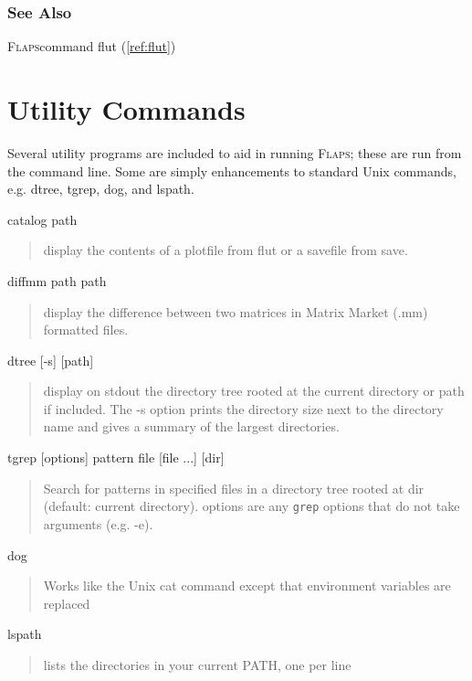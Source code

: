 \documentclass[11pt,openany,twoside]{book}
\numberwithin{equation}{section}		%
\newcommand{\Cmd}[1]{{\sf #1}}
\newcommand{\Code}[1]{{\small\tt #1}}
\newcommand{\Subst}[1]{{\small\sf #1}}
\newcommand{\Flaps}{\textsc{Flaps\:}}
\newcommand{\Spec}[1]{{\small\ttfamily #1}}
\begin{document}
\subsubsection{See Also}
\Flaps command \Cmd{flut} (\ref{ref:flut})
        
\section{Utility Commands}\label{sect:utility}
Several utility programs are included to aid in running \Flaps;
these are run from the command line. Some are simply enhancements
to standard Unix commands, e.g. \Cmd{dtree}, \Cmd{tgrep},
\Cmd{dog}, and \Cmd{lspath}.
\newline

\Spec{catalog \Subst{path}}
\begin{quote}
display the contents of a plotfile from \Cmd{flut} or a
savefile from \Cmd{save}.
\end{quote}

\Spec{diffmm \Subst{path} \Subst{path}}
\begin{quote}
display the difference between two matrices in Matrix Market (.mm) formatted files.
\end{quote}

\Spec{dtree [-s] [\Subst{path}]}
\begin{quote}
display on stdout the directory tree rooted at the
current directory or \Subst{path} if included.
The \Cmd{-s} option prints the directory size
next to the directory name and gives a summary of the
largest directories.
\end{quote}


\Spec{tgrep [options] \Subst{pattern} \Subst{file} [\Subst{file} ...] [\Subst{dir\/}]}
\begin{quote}
Search for patterns in specified files in a directory tree rooted at \Subst{dir}
(default: current directory). \Subst{options} are any \Code{grep} options
that do not take arguments (e.g. -e).
\end{quote}

\Spec{dog}
\begin{quote}
Works like the Unix \Cmd{cat} command except that environment
variables are replaced
\end{quote}

\Spec{lspath}
\begin{quote}
lists the directories in your current PATH, one per line
\end{quote}
\end{document}
